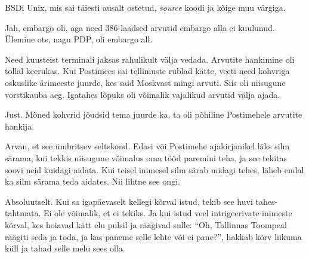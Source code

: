 
BSDi Unix, mis sai täiesti ausalt ostetud, \emph{source} 
koodi ja kõige muu värgiga. 


Jah, embargo oli, aga need 386-laadsed arvutid embargo alla ei 
kuulunud. Ülemine ots, nagu PDP, oli embargo all. 

Need kuusteist terminali jaksas rahulikult välja vedada. Arvutite hankimine oli
tollal keerukas. Kui Postimees sai tellimuste 
rublad kätte, veeti need kohvriga oskuslike ärimeeste juurde, kes said 
Moskvast mingi arvuti. Siis oli niisugune vorstikauba aeg. 
Igatahes lõpuks oli võimalik vajalikud arvutid välja ajada.


Just. Mõned kohvrid jõudsid tema juurde ka, ta oli põhiline Postimehele 
arvutite hankija.


Arvan, et see ümbritsev seltskond. Edasi või Postimehe ajakirjanikel läks silm särama, kui tekkis niisugune võimalus
oma tööd paremini teha, ja see tekitas soovi neid kuidagi aidata. 
Kui teisel inimesel silm särab midagi tehes, läheb endal ka silm särama 
teda aidates. Nii lihtne see ongi.


Absoluutselt. Kui sa igapäevaselt kellegi kõrval istud, tekib see 
huvi tahes-tahtmata. Ei ole võimalik, et ei tekiks. Ja kui istud veel 
intrigeerivate inimeste kõrval, kes hoiavad kätt elu pulsil ja 
räägivad sulle: \enquote{Oh, Tallinnas Toompeal räägiti seda ja toda, ja kas 
paneme selle lehte või ei pane?}, hakkab kõrv liikuma küll ja tahad selle melu 
sees olla.


